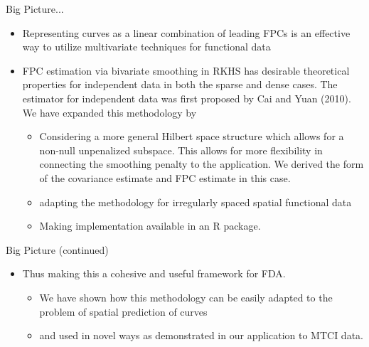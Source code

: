 \documentclass{beamer}
\begin{document}
\begin{frame}[t]{Big Picture...}
	\begin{itemize}
		\item Representing curves as a linear combination of leading FPCs is an effective way to utilize multivariate techniques for functional data
		\item FPC estimation via bivariate smoothing in RKHS has desirable theoretical properties for independent data in both the sparse and dense cases. The estimator for independent data was first proposed by Cai and Yuan (2010). We have expanded this methodology by
		\begin{itemize}
			\item Considering a more general Hilbert space structure which allows for a non-null unpenalized subspace. This allows for more flexibility in connecting the smoothing penalty to the application. We derived the form of the covariance estimate and FPC estimate in this case.
			\item adapting the methodology for irregularly spaced spatial functional data
			\item Making implementation available in an R package. 
		\end{itemize}
	\end{itemize}
\end{frame}

\begin{frame}[t]{Big Picture (continued)}
	\begin{itemize}
	\item Thus making this a cohesive and useful framework for FDA.
	\begin{itemize}
		\item We have shown how this methodology can be easily adapted to the problem of spatial prediction of curves
		\item and used in novel ways as demonstrated in our application to MTCI data.
	\end{itemize}
	\end{itemize}
	
\end{frame}

\end{document}
